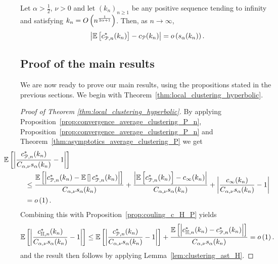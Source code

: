\begin{proposition}\label{prop:convergence_average_clustering_P_n}
Let $\alpha > \frac{1}{2}$, $\nu > 0$ and let $(k_n)_{n \ge 1}$ be any positive sequence tending to infinity and satisfying $k_n = O\left(n^{\frac{1}{2\alpha+1}}\right)$. Then, as $n \to \infty$,
\[
	\left|\mathbb{E}\left[c_{{\mathcal P},n}^\ast(k_n)\right] - c_{{\mathcal P}}(k_n)\right| = o\left(s_\alpha(k_n)\right).
\]
\end{proposition}


\subsection{Proof of the main results}\label{ssec:proof_main_results}

We are now ready to prove our main results, using the propositions stated in the previous sections. We begin with Theorem~\ref{thm:local_clustering_hyperbolic}.

\begin{proof}[Proof of Theorem \ref{thm:local_clustering_hyperbolic}]
By applying Proposition~\ref{prop:convergence_average_clustering_P_n}, Proposition~\ref{prop:convergence_average_clustering_P_n} and Theorem~\ref{thm:asymptotics_average_clustering_P} we get
\begin{align*}
	&\hspace{-30pt}\Exp{\left|\frac{c_{\Pcal,n}^\ast(k_n)}{C_{\alpha,\nu}s_\alpha(k_n)} - 1\right|}\\
	&\le \frac{\Exp{\left|c_{\Pcal,n}^\ast(k_n) - \Exp{}c_{\Pcal,n}^\ast(k_n)\right|}}{C_{\alpha,\nu}s_\alpha(k_n)}
		+ \frac{\left|\Exp{c_{\Pcal,n}^\ast(k_n)} - c_\infty(k_n)\right|}{C_{\alpha,\nu}s_\alpha(k_n)}
		+ \left|\frac{c_{\infty}(k_n)}{C_{\alpha,\nu}s_\alpha(k_n)} - 1\right| \\
	&= \smallO{1}.
\end{align*}
Combining this with Proposition~\ref{prop:couling_c_H_P} yields
\[
	\mathbb{E}\left[\left|\frac{c_{\mathbb{H},n}^\ast(k_n)}{C_{\alpha,\nu}s_\alpha(k_n)} - 1\right|\right]
	\le \mathbb{E}\left[\left|\frac{c_{{\mathcal P},n}^\ast(k_n)}{C_{\alpha,\nu}s_\alpha(k_n)} - 1\right|\right] 
	+ \frac{\mathbb{E}\left[\left|c_{\mathbb{H},n}^\ast(k_n) - c_{{\mathcal P},n}^\ast(k_n)\right|\right]}{C_{\alpha,\nu}s_\alpha(k_n)} = o\left(1\right).
\]
and the result then follows by applying Lemma~\ref{lem:clustering_ast_H}. 
\end{proof}


